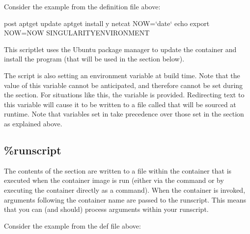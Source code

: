 \documentclass[letterpaper,10pt,english]{sphinxmanual}
\begin{document}
Consider the example from the definition file above:

%
\begin{sphinxVerbatim}[commandchars=\\\{\}]
\PYGZpc{}post
    apt\PYGZhy{}get update \PYGZam{}\PYGZam{} apt\PYGZhy{}get install \PYGZhy{}y netcat
    NOW={}`date{}`
    echo \PYGZdq{}export NOW=\PYGZbs{}\PYGZdq{}\PYGZdl{}\PYGZob{}NOW\PYGZcb{}\PYGZbs{}\PYGZdq{}\PYGZdq{} \PYGZgt{}\PYGZgt{} \PYGZdl{}SINGULARITY\PYGZus{}ENVIRONMENT
\end{sphinxVerbatim}

This  scriptlet uses the Ubuntu package manager  to update the
container and install the program  (that will be used in the
 section below).

The script is also setting an environment variable at build time.  Note that the
value of this variable cannot be anticipated, and therefore cannot be set during
the  section. For situations like this, the
 variable is provided. Redirecting text to this
variable will cause it to be written to a file called
 that will be sourced at runtime.  Note
that variables set in  take precedence over those set in the
 section as explained above.


\subsection{\%runscript}
\label{\detokenize{definition_files:runscript}}\label{\detokenize{definition_files:id2}}\label{\detokenize{definition_files:sec-runscript}}
The contents of the  section are written to a file within the
container that is executed when the container image is run (either via the
 command or by executing the container directly as a
command). When the container is invoked, arguments following the container name
are passed to the runscript. This means that you can (and should) process
arguments within your runscript.

Consider the example from the def file above:
\end{document}

